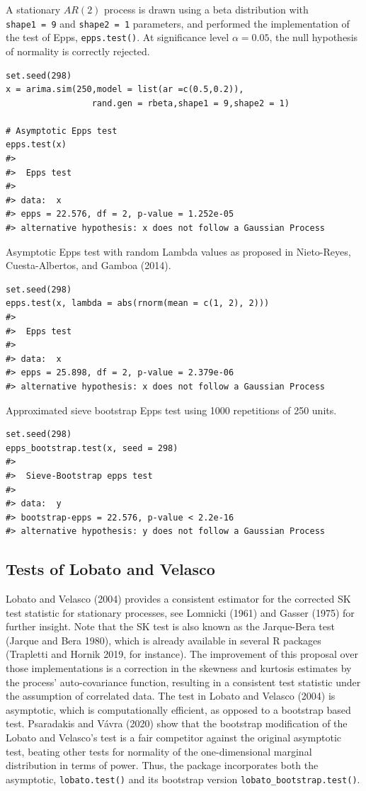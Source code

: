 A stationary \(AR(2)\) process is drawn using a beta distribution with \texttt{shape1\ =\ 9} and \texttt{shape2\ =\ 1} parameters, and performed the implementation of the test of Epps, \texttt{epps.test()}. At significance level \(\alpha = 0.05\), the null hypothesis of normality is correctly rejected.

\begin{verbatim}
set.seed(298)
x = arima.sim(250,model = list(ar =c(0.5,0.2)),
                 rand.gen = rbeta,shape1 = 9,shape2 = 1)

# Asymptotic Epps test
epps.test(x)
#> 
#>  Epps test
#> 
#> data:  x
#> epps = 22.576, df = 2, p-value = 1.252e-05
#> alternative hypothesis: x does not follow a Gaussian Process
\end{verbatim}

Asymptotic Epps test with random Lambda values as proposed in Nieto-Reyes, Cuesta-Albertos, and Gamboa (2014).

\begin{verbatim}
set.seed(298)
epps.test(x, lambda = abs(rnorm(mean = c(1, 2), 2)))
#> 
#>  Epps test
#> 
#> data:  x
#> epps = 25.898, df = 2, p-value = 2.379e-06
#> alternative hypothesis: x does not follow a Gaussian Process
\end{verbatim}

Approximated sieve bootstrap Epps test using 1000 repetitions of 250 units.

\begin{verbatim}
set.seed(298)
epps_bootstrap.test(x, seed = 298)
#> 
#>  Sieve-Bootstrap epps test
#> 
#> data:  y
#> bootstrap-epps = 22.576, p-value < 2.2e-16
#> alternative hypothesis: y does not follow a Gaussian Process
\end{verbatim}

\hypertarget{tests-of-lobato-and-velasco}{%
\subsection{Tests of Lobato and Velasco}\label{tests-of-lobato-and-velasco}}

Lobato and Velasco (2004) provides a consistent estimator for the corrected SK test statistic for stationary processes, see Lomnicki (1961) and Gasser (1975) for further insight. Note that the SK test is also known as the Jarque-Bera test (Jarque and Bera 1980), which is already available in several R packages (Trapletti and Hornik 2019, for instance). The improvement of this proposal over those implementations is a correction in the skewness and kurtosis estimates by the process' auto-covariance function, resulting in a consistent test statistic under the assumption of correlated data. The test in Lobato and Velasco (2004) is asymptotic, which is computationally efficient, as opposed to a bootstrap based test. Psaradakis and Vávra (2020) show that the bootstrap modification of the Lobato and Velasco's test is a fair competitor against the original asymptotic test, beating other tests for normality of the one-dimensional marginal distribution in terms of power. Thus, the package incorporates both the asymptotic, \texttt{lobato.test()} and its bootstrap version \texttt{lobato\_bootstrap.test()}.

